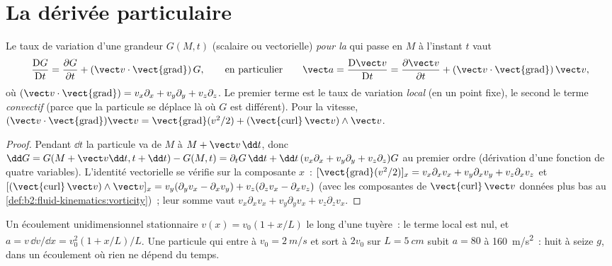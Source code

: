 \section{La dérivée particulaire}

\begin{theorem}\label{thm:b2:fluid-kinematics:material}
Le taux de variation d'une grandeur $G(M, t)$ (scalaire ou vectorielle) \emph{pour
la } qui passe en $M$ à l'instant $t$ vaut
\[
\frac{\mathrm DG}{\mathrm Dt} = \frac{\partial G}{\partial t} + (\vect v\cdot
\operatorname{\vect{grad}})\,G ,
\qquad\text{en particulier}\qquad
\vect a = \frac{\mathrm D\vect v}{\mathrm Dt} = \frac{\partial\vect v}{\partial t} +
(\vect v\cdot\operatorname{\vect{grad}})\,\vect v ,
\]
où $(\vect v\cdot\operatorname{\vect{grad}}) = v_x\partial_x + v_y\partial_y +
v_z\partial_z$. Le premier terme est le taux de variation \emph{local} (en un
point fixe), le second le terme \emph{convectif} (parce que la particule
se déplace là où $G$ est différent). Pour la vitesse, $(\vect v\cdot
\operatorname{\vect{grad}})\vect v = \operatorname{\vect{grad}}(v^2/2) +
(\operatorname{\vect{curl}}\vect v)\wedge\vect v$.
\end{theorem}

\begin{proof}
Pendant $\dd t$ la particule va de $M$ à $M + \vect v\,\dd t$, donc $\dd G =
G(M + \vect v\dd t, t + \dd t) - G(M, t) = \partial_tG\,\dd t + \dd t\,(v_x\partial_x
+ v_y\partial_y + v_z\partial_z)G$ au premier ordre (dérivation d'une fonction
de quatre variables). L'identité vectorielle se vérifie sur la
composante $x$~: $[\operatorname{\vect{grad}}(v^2/2)]_x = v_x\partial_xv_x + v_y\partial_x
v_y + v_z\partial_xv_z$ et $[(\operatorname{\vect{curl}}\vect v)\wedge\vect v]_x =
v_y(\partial_yv_x - \partial_xv_y) + v_z(\partial_zv_x - \partial_xv_z)$ (avec les
composantes de $\operatorname{\vect{curl}}\vect v$ données plus bas au
\cref{def:b2:fluid-kinematics:vorticity})~; leur somme vaut $v_x\partial_xv_x +
v_y\partial_yv_x + v_z\partial_zv_x$.
\end{proof}

\begin{example}\label{ex:b2:fluid-kinematics:nozzle}
Un écoulement unidimensionnel stationnaire $v(x) = v_0(1 + x/L)$ le long d'une tuyère~: le
terme local est nul, et $a = v\,\dd v/\dd x = v_0^2(1 + x/L)/L$. Une
particule qui entre à $v_0 = \qty{2}{m/s}$ et sort à $2v_0$ sur $L
= \qty{5}{cm}$ subit $a = 80$ à \qty{160}{m/s^2}~: huit à seize $g$, dans un
écoulement où rien ne dépend du temps.
\end{example}

